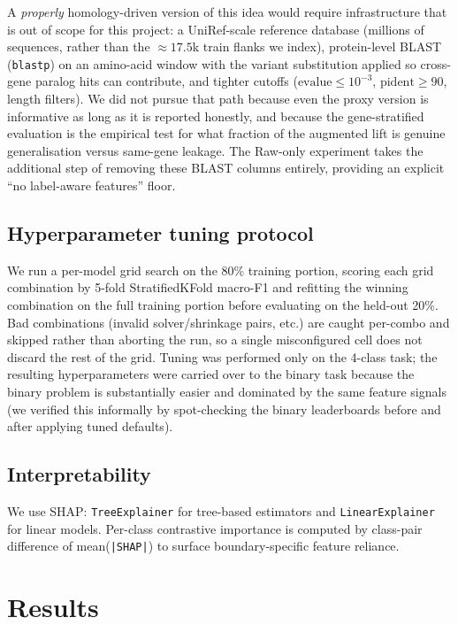 \documentclass[11pt,a4paper]{article}
\begin{document}
A \emph{properly} homology-driven version of this idea would require
infrastructure that is out of scope for this project: a UniRef-scale
reference database (millions of sequences, rather than the $\approx 17.5$k
train flanks we index), protein-level BLAST (\texttt{blastp}) on an
amino-acid window with the variant substitution applied so cross-gene paralog
hits can contribute, and tighter cutoffs ($\text{evalue}\le 10^{-3}$,
$\text{pident}\ge 90$, length filters). We did not pursue that path because
even the proxy version is informative as long as it is reported honestly, and
because the gene-stratified evaluation is the
empirical test for what fraction of the augmented lift is genuine
generalisation versus same-gene leakage. The Raw-only experiment takes the additional step of removing
these BLAST columns entirely, providing an explicit ``no label-aware features''
floor.

\subsection{Hyperparameter tuning protocol}
\label{sec:tuning-protocol}

We run a per-model grid search on the 80\% training portion, scoring each grid combination by 5-fold StratifiedKFold macro-F1 and refitting the winning combination on the full training portion before evaluating on the held-out 20\%. Bad combinations (invalid solver/shrinkage pairs, etc.) are caught per-combo and skipped rather than aborting the run, so a single misconfigured cell does not discard the rest of the grid. Tuning was performed only on the 4-class task; the resulting hyperparameters were carried over to the binary task because the binary problem is substantially easier and dominated by the same feature signals (we verified this informally by spot-checking the binary leaderboards before and after applying tuned defaults).

\subsection{Interpretability}

We use SHAP:
\texttt{TreeExplainer} for tree-based estimators and \texttt{LinearExplainer} for
linear models. Per-class contrastive importance is computed by class-pair difference
of mean(\texttt{|SHAP|}) to surface boundary-specific feature reliance.

\section{Results}
\end{document}
